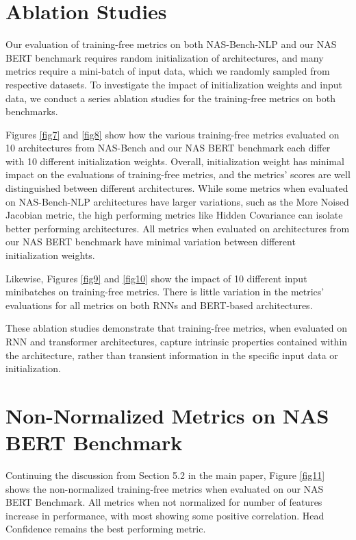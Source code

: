 \documentclass[11pt]{article}
\begin{document}
\section{Ablation Studies}
    Our evaluation of training-free metrics on both NAS-Bench-NLP and our NAS BERT benchmark requires random initialization of architectures, and many metrics require a mini-batch of input data, which we randomly sampled from respective datasets. To investigate the impact of initialization weights and input data, we conduct a series ablation studies for the training-free metrics on both benchmarks. 

    Figures \ref{fig7} and \ref{fig8} show how the various training-free metrics evaluated on 10 architectures from NAS-Bench and our NAS BERT benchmark each differ with 10 different initialization weights. Overall, initialization weight has minimal impact on the evaluations of training-free metrics, and the metrics' scores are well distinguished between different architectures. While some metrics when evaluated on NAS-Bench-NLP architectures have larger variations, such as the More Noised Jacobian metric, the high performing metrics like Hidden Covariance can isolate better performing architectures. All metrics when evaluated on architectures from our NAS BERT benchmark have minimal variation between different initialization weights.

    Likewise, Figures \ref{fig9} and \ref{fig10} show the impact of 10 different input minibatches on training-free metrics. There is little variation in the metrics' evaluations for all metrics on both RNNs and BERT-based architectures.

    These ablation studies demonstrate that training-free metrics, when evaluated on RNN and transformer architectures, capture intrinsic properties contained within the architecture, rather than transient information in the specific input data or initialization.

\section{Non-Normalized Metrics on NAS BERT Benchmark}
    Continuing the discussion from Section 5.2 in the main paper, Figure \ref{fig11} shows the non-normalized training-free metrics when evaluated on our NAS BERT Benchmark. All metrics when not normalized for number of features increase in performance, with most showing some positive correlation. Head Confidence remains the best performing metric. 
    
\end{document}
